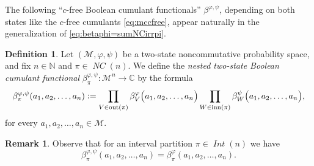 \documentclass[12pt]{amsart}
\DeclareMathOperator{\IntPart}{\mathit{Int}}
\DeclareMathOperator{\NC}{\mathit{NC}} %
\DeclareMathOperator{\IB}{\mathrm{inn}} %
\DeclareMathOperator{\OB}{\mathrm{out}} %
\newcommand{\alg}[1]{\mathcal{#1}}
\theoremstyle{definition}
\newtheorem{definition}[theorem]{Definition}
\newtheorem{remark}[theorem]{Remark}
\numberwithin{equation}{section}
\begin{document}
The following ``$c$-free Boolean cumulant functionals''
$\beta^{\varphi,\psi}$,
depending on both states like the $c$-free cumulants \eqref{eq:mccfree},
appear naturally in the generalization of \eqref{eq:betaphi=sumNCirrpi}.
\begin{definition}
	\label{def:BooleanChiPhi}
	Let $(\alg{M},\varphi,\psi)$ be a two-state noncommutative probability space, and fix $n \in \mathbb{N}$ and $\pi \in \NC(n)$.  
	We define the \emph{nested two-state Boolean cumulant functional} $\beta^{\varphi,\psi}_\pi:\mathcal{M}^n\to\mathbb{C}$ by the formula
	\begin{align*}
		\beta^{\varphi,\psi}_\pi(a_1,a_2,\ldots,a_n)
		:=\prod_{
			V\in\OB(\pi)            
		}
		\beta_{V}^{\varphi}\bigl(a_1,a_2,\ldots,a_n\bigr)
		\prod_{
			W\in\IB(\pi)  
		}
		\beta_{W}^{\psi}\bigl(a_1,a_2,\ldots,a_n\bigr),
	\end{align*}
	for every $a_1,a_2,\ldots,a_n\in \alg{M}$.
\end{definition}
\begin{remark}
	Observe that for an interval partition $\pi\in \IntPart(n)$ we have 
	\[\beta^{\varphi,\psi}_\pi(a_1,a_2,\ldots,a_n)=\beta^{\varphi}_\pi(a_1,a_2,\ldots,a_n).\]
\end{remark}
\end{document}
